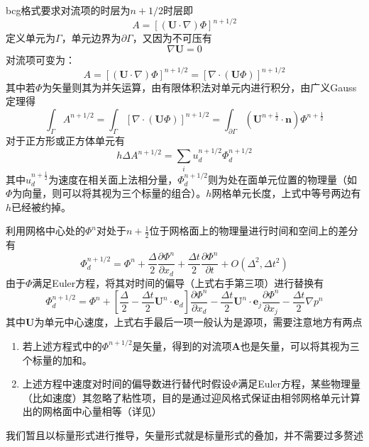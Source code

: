 \documentclass[lang=cn,11pt,a4paper]{elegantpaper}
\begin{document}
bcg格式要求对流项的时层为$n+1/2$时层即
\begin{equation}
A = [(\mathbf{U}\cdot \nabla)  \Phi]^{n+1/2}
\end{equation}定义单元为$\Gamma$，单元边界为$\partial \Gamma$，又因为不可压有
\begin{equation}
\nabla \mathbf{U} = 0
\end{equation}
对流项可变为：
\begin{equation}
A= [(\mathbf{U}\cdot \nabla)  \Phi]^{n+1/2}=[\nabla\cdot (\mathbf{U}\Phi)]^{n+1/2}
\end{equation}
其中若$\Phi$为矢量则其为并矢运算，由有限体积法对单元内进行积分，由广义Gauss定理得
\begin{equation}
\int_\Gamma A^{n+1/2} =\int_\Gamma[\nabla\cdot (\mathbf{U}\Phi)]^{n+1/2} =\int_{\partial \Gamma}(\mathbf{U}^{n+\frac{1}{2}}\cdot\mathbf{n})\Phi^{n+\frac{1}{2}}
\end{equation}
对于正方形或正方体单元有
\begin{equation}\label{equ:sum}
h\Delta A^{n+1/2}  = \sum_i u^{n+1/2}_d \Phi^{n+1/2}_d
\end{equation}
其中$u^{n+\frac{1}{2}}_d$为速度在相关面上法相分量，$\Phi^{n+1/2}_d$则为处在面单元位置的物理量（如$\Phi$为向量，则可以将其视为三个标量的组合）。$h$网格单元长度，上式中等号两边有$h$已经被约掉。\par
利用网格中心处的$\Phi^{n}$对处于$n+ \frac{1}{2}$位于网格面上的物理量进行时间和空间上的差分有
\begin{equation}
    \Phi^{n+1/2}_d = \Phi^n+\frac{\Delta}{2}\frac{\partial \Phi^n}{\partial x_d}+\frac{\Delta t}{2}\frac{\partial \Phi^n}{\partial t}+O(\Delta^2,\Delta t^2)
\end{equation}
由于$\Phi$满足Euler方程，将其对时间的偏导（上式右手第三项）进行替换有
\begin{equation}\label{equ:euler}
\Phi^{n+1/2}_d = \Phi^n+[\frac{\Delta}{2}-\frac{\Delta t}{2} \mathbf{U}^{n} \cdot \mathbf{e}_d]\frac{\partial \Phi^n}{\partial x_d} - \frac{\Delta t}{2} \mathbf{U}^{n} \cdot \mathbf{e}_j\frac{\partial \Phi^n}{\partial x_j}-\frac{\Delta t}{2}\nabla p^n
\end{equation}
其中$ \mathbf{U}$为单元中心速度，上式右手最后一项一般认为是源项，需要注意地方有两点
\begin{enumerate}
    \item 若上述方程式中的$\Phi^{n+1/2}$是矢量，得到的对流项$\mathbf{A}$也是矢量，可以将其视为三个标量的加和。
    \item 上述方程中速度对时间的偏导数进行替代时假设$\Phi$满足Euler方程，某些物理量（比如速度）其忽略了粘性项，目的是通过迎风格式保证由相邻网格单元计算出的网格面中心量相等（详见\cite{bell1989second}）
\end{enumerate}
我们暂且以标量形式进行推导，矢量形式就是标量形式的叠加，并不需要过多赘述
\end{document}
